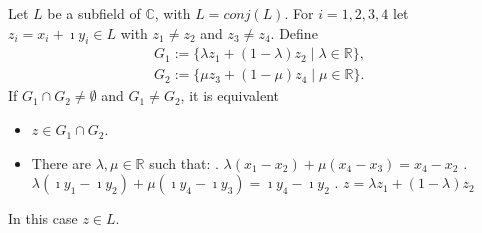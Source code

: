 \begin{lemma}
    \label{lem:ConjClosed.Intersection_line_line}
    \leanok
    Let $L$ be a subfield of $\mathbb{C}$, with $L = conj(L)$. For $i = 1,2,3,4$ let $z_i = x_i + \imath y_i \in L$ with $z_1 \ne z_2$ and $z_3 \ne z_4$. Define
    \begin{equation*}\begin{aligned}
        G_1 := \{\lambda z_1 + (1-\lambda)z_2 \mid \lambda \in \mathbb{R}\},\\
        G_2 := \{\mu z_3 + (1-\mu)z_4 \mid \mu \in \mathbb{R}\}.
    \end{aligned} \end{equation*}
    If $G_1 \cap G_2 \ne \emptyset$ and $G_1 \ne G_2$, it is equivalent 
    \begin{itemize}
        \item $z\in G_1 \cap G_2$.
        \item There are $\lambda, \mu \in \mathbb{R}$ such that:
        . $\lambda(x_1 - x_2)+\mu(x_4-x_3) = x_4-x_2$
        . $\lambda(\imath y_1 - \imath y_2)+\mu(\imath y_4-\imath y_3) = \imath y_4-\imath y_2$
        . $z = \lambda z_1 + (1-\lambda)z_2$
    \end{itemize}
    In this case $z \in L$.
\end{lemma}
